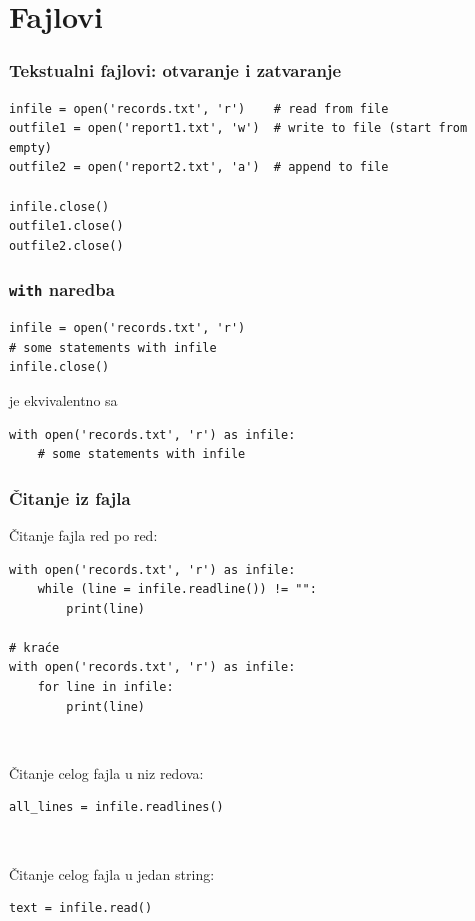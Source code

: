 \documentclass[compress]{beamer}
\begin{document}
\section{Fajlovi}

\begin{frame}[fragile]
\frametitle{Tekstualni fajlovi: otvaranje i zatvaranje}
\begin{verbatim}
infile = open('records.txt', 'r')    # read from file
outfile1 = open('report1.txt', 'w')  # write to file (start from empty)
outfile2 = open('report2.txt', 'a')  # append to file

infile.close()
outfile1.close()
outfile2.close()
\end{verbatim}
\end{frame}

\begin{frame}[fragile]
\frametitle{\texttt{with} naredba}
\begin{verbatim}
infile = open('records.txt', 'r')
# some statements with infile
infile.close()
\end{verbatim}

je ekvivalentno sa

\begin{verbatim}
with open('records.txt', 'r') as infile:
    # some statements with infile
\end{verbatim}
\end{frame}

\begin{frame}[fragile]
\frametitle{Čitanje iz fajla}

Čitanje fajla red po red:
\begin{verbatim}
with open('records.txt', 'r') as infile:
    while (line = infile.readline()) != "":
        print(line)

# kraće
with open('records.txt', 'r') as infile:
    for line in infile:
        print(line)
\end{verbatim}

\ %

Čitanje celog fajla u niz redova:
\begin{verbatim}
all_lines = infile.readlines()
\end{verbatim}

\ %

Čitanje celog fajla u jedan string:
\begin{verbatim}
text = infile.read()
\end{verbatim}
\end{frame}
\end{document}
